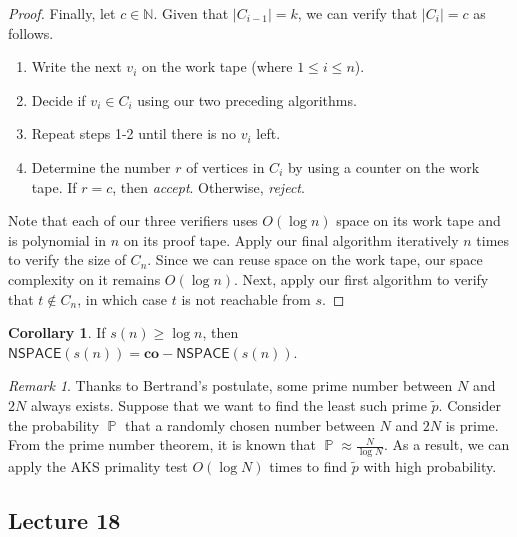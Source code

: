 \documentclass[10pt,letterpaper,cm]{nupset}
\theoremstyle{definition}
\theoremstyle{theorem}
\newtheorem{corollary}[definition]{Corollary}
\theoremstyle{remark}
\newtheorem{remark}[definition]{Remark}
\newcommand{\N}{\mathbb N}
\newcommand{\1}{\mathbf{1}}
\newcommand{\0}{\vec 0}
\DeclareMathOperator{\pr}{\mathbb{P}}
\begin{document}
\begin{proof}
\smallskip

Finally, let $c\in \N$. Given that $\left\lvert{C_{i-1}}\right\rvert=k$, we can verify that $\left\lvert{C_i}\right\rvert = c$ as follows. 
\begin{enumerate} 
\item Write the next $v_i$ on the work tape (where $1\leq i \leq n$). 
\item Decide if $v_i \in C_i$ using our two preceding algorithms.
\item Repeat steps 1-2 until there is no $v_i$ left.
\item Determine the number $r$ of vertices in $C_i$ by using a counter on the work tape. If $r = c$, then \textit{accept}. Otherwise, \textit{reject}.
\end{enumerate}

Note that each of our three verifiers uses $O(\log{n})$ space on its work tape and  is polynomial in $n$ on its proof tape. Apply our final algorithm iteratively $n$ times to verify the size of  $C_n$. Since we can reuse space on the work tape, our space complexity on it remains $O(\log{n})$.  Next, apply our first algorithm to verify that $t\notin C_n$, in which case $t$ is not reachable from $s$.
\end{proof}

\begin{corollary}
If $s(n) \geq \log{n}$, then $\mathsf{NSPACE}(s(n)) = \mathbf{co}{-}\mathsf{NSPACE}(s(n))$.
\end{corollary}

\bigskip

\begin{remark}
Thanks to Bertrand's postulate, some prime number between $N$ and $2N$ always exists.  Suppose that we want to find the least such prime $\tilde{p}$. Consider the probability $\pr$ that a randomly chosen number between $N$ and $2N$ is prime. From the prime number theorem, it is known that $\pr \approx \frac{N}{\log{N}}$. As a result, we can apply the AKS primality test $O(\log{N})$ times to find $\tilde{p}$ with high probability.
\end{remark}

\subsection{Lecture 18}
\end{document}
